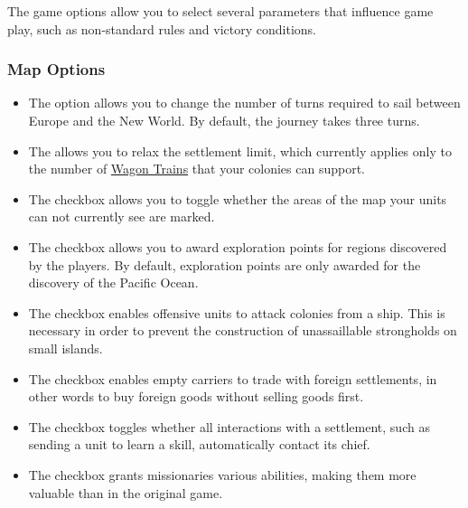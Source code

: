 \documentclass[12pt]{book}
\begin{document}
The game options allow you to select several parameters that
influence game play, such as non-standard rules and victory
conditions.

\hypertarget{map options}{\subsubsection{Map Options}}

\begin{itemize}

\item The option  allows you to change the
  number of turns required to sail between Europe and the New
  World. By default, the journey takes three turns.

\item The  allows you to relax the
  settlement limit, which currently applies only to the number of
  \hyperlink{Wagon Train}{Wagon Trains} that your colonies can
  support.

\item The checkbox  allows you to toggle whether
  the areas of the map your units can not currently see are marked.

\item The checkbox  allows you to award
  exploration points for regions discovered by the players. By
  default, exploration points are only awarded for the discovery of
  the Pacific Ocean.

\item The checkbox  enables offensive units
  to attack colonies from a ship. This is necessary in order to
  prevent the construction of unassaillable strongholds on small
  islands.

\item The checkbox  enables empty carriers
  to trade with foreign settlements, in other words to buy foreign
  goods without selling goods first.

\item The checkbox  toggles whether all
  interactions with a settlement, such as sending a unit to learn a
  skill, automatically contact its chief.

\item The checkbox  grants missionaries
  various abilities, making them more valuable than in the original
  game.


\end{itemize}
\end{document}
